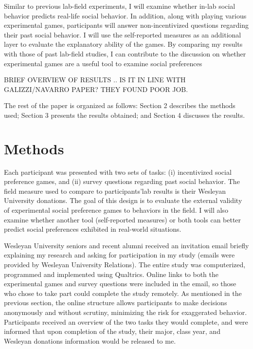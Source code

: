 \documentclass[12pt]{article}
\begin{document}
Similar to previous lab-field experiments, I will examine whether in-lab social behavior predicts real-life social behavior. In addition, along with playing various experimental games, participants will answer non-incentivized questions regarding their past social behavior. I will use the self-reported measures as an additional layer to evaluate the explanatory ability of the games. By comparing my results with those of past lab-field studies, I can contribute to the discussion on whether experimental games are a useful tool to examine social preferences

{\color{red} BRIEF OVERVIEW OF RESULTS .. IS IT IN LINE WITH GALIZZI/NAVARRO PAPER? THEY FOUND POOR JOB. }

The rest of the paper is organized as follows: Section 2 describes the methods used; Section 3 presents the results obtained; and Section 4 discusses the results.


\section{Methods}

Each participant was presented with two sets of tasks: (i) incentivized social preference games, and (ii) survey questions regarding past social behavior. The field measure used to compare to participants\rq lab results is their Wesleyan University donations. The goal of this design is to evaluate the external validity of experimental social preference games to behaviors in the field. I will also examine whether another tool (self-reported measures) or both tools can better predict social preferences exhibited in real-world situations. 
 
Wesleyan University seniors and recent alumni received an invitation email briefly explaining my research and asking for participation in my study (emails were provided by Wesleyan University Relations). The entire study was computerized, programmed and implemented using Qualtrics. Online links to both the experimental games and survey questions were included in the email, so those who chose to take part could complete the study remotely. As mentioned in the previous section, the online structure allows participants to make decisions anonymously and without scrutiny, minimizing the risk for exaggerated behavior. Participants received an overview of the two tasks they would complete, and were informed that upon completion of the study, their major, class year, and Wesleyan donations information would be released to me.
\end{document}
